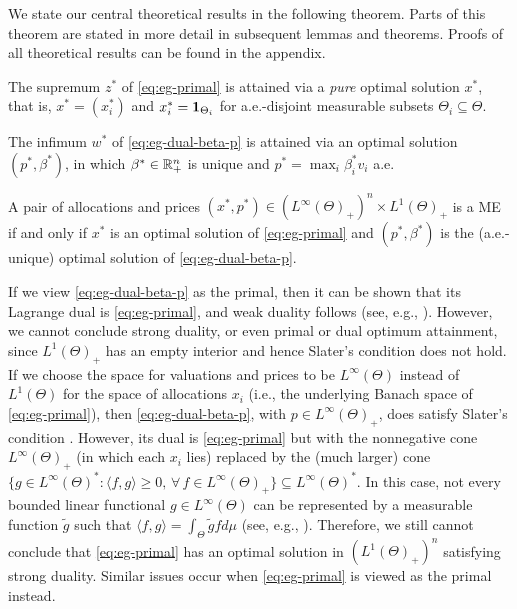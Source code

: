 We state our central theoretical results in the following theorem. Parts of this theorem are stated in more detail in subsequent lemmas and theorems. 
Proofs of all theoretical results can be found in the appendix. 
\begin{theorem}
	\begin{enumerate*}[label=(\alph*)]
		\item The supremum $z^*$ of \eqref{eq:eg-primal} is attained via a \emph{pure} optimal solution $x^*$, that is, $x^* = (x^*_i)$ and $x^*_i = \mathbf{1}_{\Theta_i}$ for a.e.-disjoint measurable subsets $\Theta_i\subseteq \Theta$. \label{item:eg-primal-attain}
		\item The infimum $w^*$ of \eqref{eq:eg-dual-beta-p} is attained via an optimal solution $(p^*, \beta^*)$, in which $\beta^*\in \mathbb{R}^n_+$ is unique and $p^* = \max_i \beta^*_i v_i$ a.e. \label{item:eg-dual-p-beta-attain}
		\item A pair of allocations and prices $(x^*, p^*) \in (L^\infty(\Theta)_+)^n \times L^1(\Theta)_+$ is a ME if and only if $x^*$ is an optimal solution of \eqref{eq:eg-primal} and $(p^*, \beta^*)$ is the (a.e.-unique) optimal solution of \eqref{eq:eg-dual-beta-p}. \label{item:eg-equi-iff-opt}
	\end{enumerate*}
	\label{thm:eg-equi-opt-combined}
\end{theorem}

\begin{remark}
	\normalfont
	If we view \eqref{eq:eg-dual-beta-p} as the primal, then it can be shown that its Lagrange dual is \eqref{eq:eg-primal}, and weak duality follows (see, e.g., \cite[\S 3]{ponstein2004approaches}). 
	However, we cannot conclude strong duality, or even primal or dual optimum attainment, since $L^1(\Theta)_+$ has an empty interior \cite[\S 8.8 Problem 1]{luenberger1997optimization} and hence Slater's condition does not hold.
	If we choose the space for valuations and prices to be $L^\infty(\Theta)$ instead of $L^1(\Theta)$ for the space of allocations $x_i$ (i.e., the underlying Banach space of \eqref{eq:eg-primal}), then \eqref{eq:eg-dual-beta-p}, with $p \in L^\infty(\Theta)_+$, does satisfy Slater's condition \cite[\S 8.8 Problem 2]{luenberger1997optimization}. 
	However, its dual is \eqref{eq:eg-primal} but with the nonnegative cone $L^\infty(\Theta)_+$ (in which each $x_i$ lies) replaced by the (much larger) cone $\{ g \in L^\infty(\Theta)^*: \langle f, g \rangle \geq 0,\, \forall\, f\in L^\infty(\Theta)_+ \}\subseteq L^\infty(\Theta)^*$. In this case, not every bounded linear functional $g\in L^\infty(\Theta)$ can be represented by a measurable function $\tilde{g}$ such that $\langle f, g \rangle = \int_\Theta \tilde{g}f d\mu$ (see, e.g., \citep{day1973normed}). 
	Therefore, we still cannot conclude that \eqref{eq:eg-primal} has an optimal solution in $(L^1(\Theta)_+)^n$ satisfying strong duality. 
	Similar issues occur when \eqref{eq:eg-primal} is viewed as the primal instead. \label{remark:why-define-cp-then-prove}
\end{remark}

